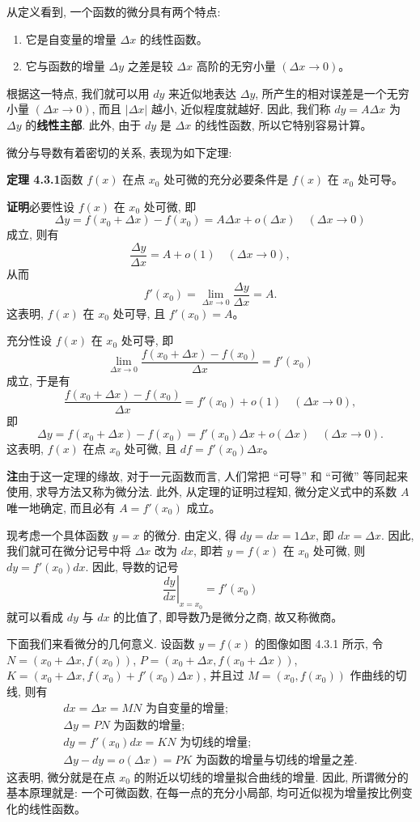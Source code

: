 \documentclass[UTF8, 12pt, fontset=fandol, oneside]{ctexart}
\begin{document}
从定义看到, 一个函数的微分具有两个特点:
\begin{enumerate}
  \item 它是自变量的增量 $\Delta x$ 的线性函数。
  \item 它与函数的增量 $\Delta y$ 之差是较 $\Delta x$ 高阶的无穷小量 $(\Delta x\to0)$。
\end{enumerate}
根据这一特点, 我们就可以用 $dy$ 来近似地表达 $\Delta y$, 所产生的相对误差是一个无穷小量 $(\Delta x\to0)$, 而且 $|\Delta x|$ 越小, 近似程度就越好. 因此, 我们称 $dy=A\Delta x$ 为 $\Delta y$ 的\textbf{线性主部}. 此外, 由于 $dy$ 是 $\Delta x$ 的线性函数, 所以它特别容易计算。

微分与导数有着密切的关系, 表现为如下定理:

\noindent\textbf{定理 4.3.1}\quad 函数 $f(x)$ 在点 $x_0$ 处可微的充分必要条件是 $f(x)$ 在 $x_0$ 处可导。

\noindent\textbf{证明}\quad 必要性\quad 设 $f(x)$ 在 $x_0$ 处可微, 即
\[
  \Delta y=f(x_0+\Delta x)-f(x_0)=A\Delta x+o(\Delta x)
  \quad(\Delta x\to0)
\]
成立, 则有
\[
  \frac{\Delta y}{\Delta x}
  =
  A+o(1)
  \quad(\Delta x\to0),
\]
从而
\[
  f'(x_0)
  =
  \lim_{\Delta x\to0}\frac{\Delta y}{\Delta x}
  =
  A.
\]
这表明, $f(x)$ 在 $x_0$ 处可导, 且 $f'(x_0)=A$。

充分性\quad 设 $f(x)$ 在 $x_0$ 处可导, 即
\[
  \lim_{\Delta x\to0}
  \frac{f(x_0+\Delta x)-f(x_0)}{\Delta x}
  =
  f'(x_0)
\]
成立, 于是有
\[
  \frac{f(x_0+\Delta x)-f(x_0)}{\Delta x}
  =
  f'(x_0)+o(1)
  \quad(\Delta x\to0),
\]
即
\[
  \Delta y=f(x_0+\Delta x)-f(x_0)
  =
  f'(x_0)\Delta x+o(\Delta x)
  \quad(\Delta x\to0).
\]
这表明, $f(x)$ 在点 $x_0$ 处可微, 且 $df=f'(x_0)\Delta x$。

\noindent\textbf{注}\quad 由于这一定理的缘故, 对于一元函数而言, 人们常把 ``可导'' 和 ``可微'' 等同起来使用, 求导方法又称为微分法. 此外, 从定理的证明过程知, 微分定义式中的系数 $A$ 唯一地确定, 而且必有 $A=f'(x_0)$ 成立。

现考虑一个具体函数 $y=x$ 的微分. 由定义, 得 $dy=dx=1\Delta x$, 即 $dx=\Delta x$. 因此, 我们就可在微分记号中将 $\Delta x$ 改为 $dx$, 即若 $y=f(x)$ 在 $x_0$ 处可微, 则 $dy=f'(x_0)dx$. 因此, 导数的记号
\[
  \left.\frac{dy}{dx}\right|_{x=x_0}=f'(x_0)
\]
就可以看成 $dy$ 与 $dx$ 的比值了, 即导数乃是微分之商, 故又称微商。

下面我们来看微分的几何意义. 设函数 $y=f(x)$ 的图像如图 4.3.1 所示, 令 $N=(x_0+\Delta x,f(x_0))$, $P=(x_0+\Delta x,f(x_0+\Delta x))$, $K=(x_0+\Delta x,f(x_0)+f'(x_0)\Delta x)$, 并且过 $M=(x_0,f(x_0))$ 作曲线的切线, 则有
\[
\begin{gathered}
  dx=\Delta x=MN\text{ 为自变量的增量;}\\
  \Delta y=PN\text{ 为函数的增量;}\\
  dy=f'(x_0)dx=KN\text{ 为切线的增量;}\\
  \Delta y-dy=o(\Delta x)=PK\text{ 为函数的增量与切线的增量之差.}
\end{gathered}
\]
这表明, 微分就是在点 $x_0$ 的附近以切线的增量拟合曲线的增量. 因此, 所谓微分的基本原理就是: 一个可微函数, 在每一点的充分小局部, 均可近似视为增量按比例变化的线性函数。
\end{document}
